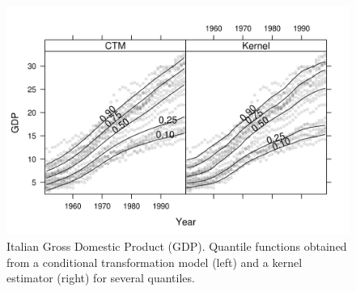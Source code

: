 



\begin{figure}
\includegraphics{figures/fig-Italy-plot}
\caption{Italian Gross Domestic Product (GDP). Quantile functions obtained from
         a conditional transformation model (left) and a kernel estimator (right)
         for several quantiles. \label{Italy-plot}}
\end{figure}
